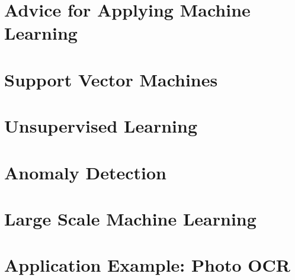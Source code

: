 \documentclass{article}
\begin{document}
    \section{Advice for Applying Machine Learning}


    
    \section{Support Vector Machines}



    \section{Unsupervised Learning}



    \section{Anomaly Detection}



    \section{Large Scale Machine Learning}



    \section{Application Example: Photo OCR}
\end{document}
